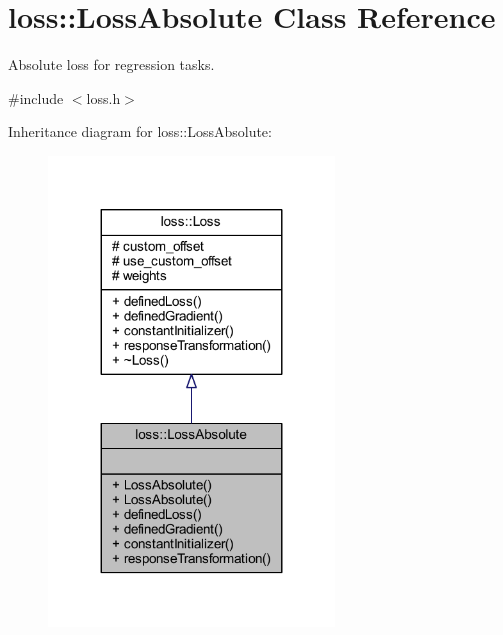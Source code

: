 \hypertarget{classloss_1_1_loss_absolute}{}\section{loss\+:\+:Loss\+Absolute Class Reference}
\label{classloss_1_1_loss_absolute}


Absolute loss for regression tasks.  




{\ttfamily \#include $<$loss.\+h$>$}



Inheritance diagram for loss\+:\+:Loss\+Absolute\+:
\nopagebreak
\begin{figure}[H]
\begin{center}
\leavevmode
\includegraphics[width=215pt]{classloss_1_1_loss_absolute__inherit__graph}
\end{center}
\end{figure}


